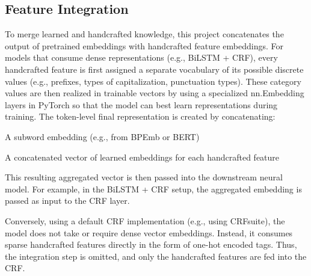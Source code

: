 \subsection{Feature Integration}
To merge learned and handcrafted knowledge, this project concatenates the output of pretrained embeddings with handcrafted feature embeddings. For models that consume dense representations (e.g., BiLSTM + CRF), every handcrafted feature is first assigned a separate vocabulary of its possible discrete values (e.g., prefixes, types of capitalization, punctuation types). These category values are then realized in trainable vectors by using a specialized nn.Embedding layers in PyTorch so that the model can best learn representations during training.
The token-level final representation is created by concatenating:
\begin{compactitem}
\item A subword embedding (e.g., from BPEmb or BERT)
\item A concatenated vector of learned embeddings for each handcrafted feature
\end{compactitem}
This resulting aggregated vector is then passed into the downstream neural model. For example, in the BiLSTM + CRF setup, the aggregated embedding is passed as input to the CRF layer.

Conversely, using a default CRF implementation (e.g., using CRFsuite), the model does not take or require dense vector embeddings. Instead, it consumes sparse handcrafted features directly in the form of one-hot encoded tags. Thus, the integration step is omitted, and only the handcrafted features are fed into the CRF.

